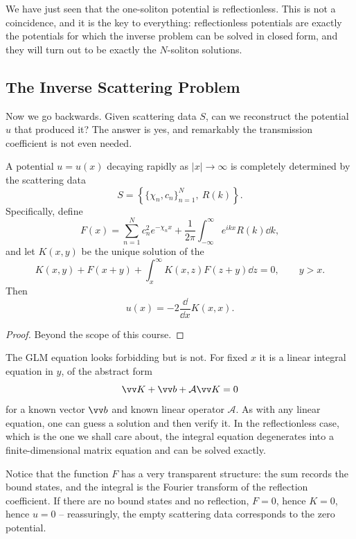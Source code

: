 We have just seen that the one-soliton potential is reflectionless. This is not a coincidence, and it is the key to everything: reflectionless potentials are exactly the potentials for which the inverse problem can be solved in closed form, and they will turn out to be exactly the $N$-soliton solutions.

\subsection{The Inverse Scattering Problem}

Now we go backwards. Given scattering data $S$, can we reconstruct the potential $u$ that produced it? The answer is yes, and remarkably the transmission coefficient is not even needed.

\begin{theorem}
	A potential $u = u(x)$ decaying rapidly as $|x|\to\infty$ is completely determined by the scattering data
	$$
	S = \left\{\{\chi_n, c_n\}_{n=1}^N,\ R(k)\right\}.
	$$
	Specifically, define
	$$
	F(x) = \sum_{n=1}^N c_n^2e^{-\chi_n x} + \frac{1}{2\pi}\int_{-\infty}^\infty e^{ikx}R(k)\dd k,
	$$
	and let $K(x,y)$ be the unique solution of the 
	$$
	K(x,y) + F(x+y) + \int_x^\infty K(x,z)F(z+y)\dd z = 0, \qquad y > x.
	$$
	Then
	$$
	u(x) = -2\frac{\dd}{\dd x}K(x,x).
	$$
\end{theorem}
\begin{proof}
	Beyond the scope of this course.
\end{proof}

The GLM equation looks forbidding but is not. For fixed $x$ it is a linear integral equation in $y$, of the abstract form
$$
\vv K + \vv b + \mathcal A\vv K = 0
$$
for a known vector $\vv b$ and known linear operator $\mathcal A$. As with any linear equation, one can guess a solution and then verify it. In the reflectionless case, which is the one we shall care about, the integral equation degenerates into a finite-dimensional matrix equation and can be solved exactly.

Notice that the function $F$ has a very transparent structure: the sum records the bound states, and the integral is the Fourier transform of the reflection coefficient. If there are no bound states and no reflection, $F = 0$, hence $K = 0$, hence $u = 0$ -- reassuringly, the empty scattering data corresponds to the zero potential.

